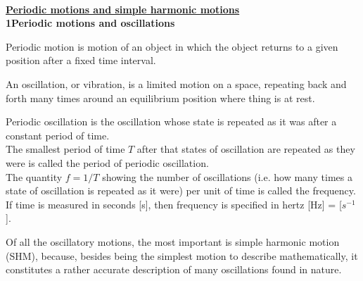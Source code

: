 \documentclass[a4paper,12pt,oneside]{report}
\newenvironment{tree}[4]{
\begin{list}{#1}{\parskip=0in \topsep=0in \itemsep=0in \parsep=0in \partopsep=0in \leftmargin=#2 \rightmargin=#3 \itemindent=#4 \listparindent=\itemindent}
}{\end{list}}
\newenvironment{ssection}[5]{
\phantom{#1}\textbf{#2\space#3}
\begin{tree}{#4}{0in}{0in}{#5}
}{\end{tree}}
\begin{document}
\centerline{}\ \\ \par \noindent
{} \textbf{\underline{Periodic motions and simple harmonic motions}} \\
\begin{ssection}{\quad}{1}{Periodic motions and oscillations}{\textbullet}{\parindent}
\item Periodic motion is motion of an object in which the object returns to a given position after a fixed time interval.
\item An oscillation, or vibration, is a limited motion on a space, repeating back and forth many times around an equilibrium position where thing is at rest.
\item Periodic oscillation is the oscillation whose state is repeated as it was after a constant period of time.\\
\indent The smallest period of time $T$ after that states of oscillation are repeated as they were is called the period of periodic oscillation.\\
\indent The quantity $f=1/T$ showing the number of oscillations (i.e. how many times a state of oscillation is repeated as it were) per unit of time is called the frequency.\\
\indent If time is measured in seconds [s], then frequency is specified in hertz [Hz] = [$s^{-1}$].
\item Of all the oscillatory motions, the most important is simple harmonic motion (SHM), because, besides being the simplest motion to describe mathematically, it constitutes a rather accurate description of many oscillations found in nature.
\end{ssection}\
\end{document}
